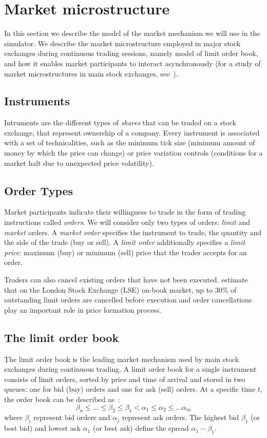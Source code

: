 \section{Market microstructure}
\label{Chapters/Background/Market-Microstructure}

In this section we describe the model of the market mechanism we will use in the simulator. We describe the market microstructure employed in major stock exchanges during continuous trading sessions, namely model of limit order book, and how it enables market participants to interact asynchronously (for a study of market microstructures in main stock exchanges, see~\cite{Comerton2004}). 


\subsection{Instruments}
Intruments are the different types of \textit{shares} that can be traded on a stock exchange, that represent ownership of a company. Every instrument is associated with a set of technicalities, such as the minimum tick size (minimum amount of money by which the price can change) or price variation controls (conditions for a market halt due to unexpected price volatility).

\subsection{Order Types}
Market participants indicate their willingness to trade in the form of trading instructions called \textit{orders}. We will consider only two types of orders: \textit{limit} and \textit{market} orders. A \textit{market order} specifies the instrument to trade, the quantity and the side of the trade (buy or sell). A \textit{limit order} additionally specifies a \textit{limit price}: maximum (buy) or minimum (sell) price that the trader accepts for an order. 

Traders can also cancel existing orders that have not been executed. \citet{Lilo2004} estimate that on the London Stock Exchange (LSE) on-book market, up to 30\% of outstanding limit orders are cancelled before execution and order cancellations play an important role in price formation process. 

\subsection{The limit order book}
The limit order book is the leading market mechanism used by main stock exchanges during continuous trading. A limit order book for a single instrument consists of limit orders, sorted by price and time of arrival and stored in two queues: one for bid (buy) orders and one for ask (sell) orders. At a specific time $t$, the order book can be described as~\cite{Gilles2006}: 
\begin{equation*}
\beta_n \leq \ldots \leq \beta_2 \leq \beta_1 < \alpha_1 \leq \alpha_2 \leq \ldots \alpha_m
\end{equation*}
where $\beta_i$ represent bid orders and $\alpha_j$ represent ask orders. The highest bid $\beta_1$ (or best bid) and lowest ask $\alpha_1$ (or best ask) define the spread $\alpha_1 - \beta_1$.

